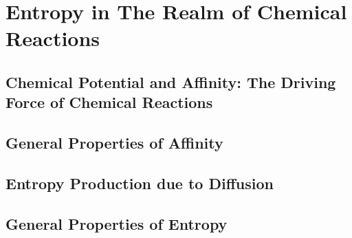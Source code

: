 \chapter{Entropy in The Realm of Chemical Reactions}
\section{Chemical Potential and Affinity: The Driving Force of Chemical Reactions}
\section{General Properties of Affinity}
\section{Entropy Production due to Diffusion}
\section{General Properties of Entropy}
